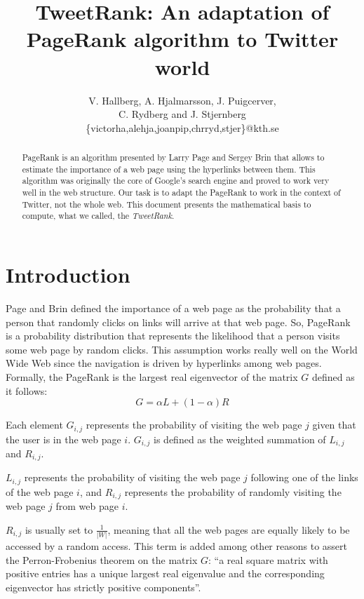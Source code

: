 \documentclass[12pt,a4paper]{article}
\author{V. Hallberg, A. Hjalmarsson, J. Puigcerver, \\C. Rydberg and J. Stjernberg\\
\footnotesize{\{victorha,alehja,joanpip,chrryd,stjer\}@kth.se}}
\title{TweetRank: An adaptation of PageRank algorithm to Twitter world}
\begin{document}
\maketitle
\begin{abstract}
\noindent
PageRank is an algorithm presented by Larry Page and Sergey Brin that allows to estimate the importance of a web page using the hyperlinks between them. This algorithm was originally the core of Google's search engine and proved to work very well in the web structure. Our task is to adapt the PageRank to work in the context of Twitter, not the whole web. This document presents the mathematical basis to compute, what we called, the \emph{TweetRank}.
\end{abstract}
\tableofcontents

\newpage

\section{Introduction}
Page and Brin defined the importance of a web page as the probability that a person that randomly clicks on links will arrive at that web page. So, PageRank is a probability distribution that represents the likelihood that a person visits some web page by random clicks. This assumption works really well on the World Wide Web since the navigation is driven by hyperlinks among web pages. \\ 

Formally, the PageRank is the largest real eigenvector of the matrix $G$ defined as it follows:
\begin{equation}\label{eq:basic_pr}
G = \alpha L + (1-\alpha) R
\end{equation}

Each element $G_{i,j}$ represents the probability of visiting the web page $j$ given that the user is in the web page $i$. $G_{i,j}$ is defined as the weighted summation of $L_{i,j}$ and $R_{i,j}$.

$L_{i,j}$ represents the probability of visiting the web page $j$ following one of the links of the web page $i$, and $R_{i,j}$ represents the probability of randomly visiting the web page $j$ from web page $i$. 

$R_{i,j}$ is usually set to $\frac{1}{|W|}$, meaning that all the web pages are equally likely to be accessed by a random access. This term is added among other reasons to assert the Perron-Frobenius theorem on the matrix $G$: ``a real square matrix with positive entries has a unique largest real eigenvalue and the corresponding eigenvector has strictly positive components''. \\
\end{document}
